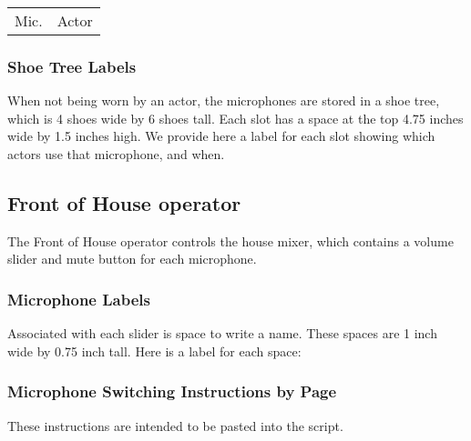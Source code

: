 \documentclass[letterpaper]{article}
\begin{document}
\begin{center}
\begin{longtable}{|l|l|}
\hline Mic. & Actor \endhead \hline

\end{longtable}
\end{center}

\subsubsection {Shoe Tree Labels}

When not being worn by an actor, the microphones are stored in a shoe tree,
which is 4 shoes wide by 6 shoes tall.  
Each slot has a space at the top 4.75 inches wide
by 1.5 inches high.  We provide here a label for each slot showing which
actors use that microphone, and when.

{\Large

}

\subsection {Front of House operator}

The Front of House operator controls the house mixer, 
which contains a volume slider
and mute button for each microphone.  

\subsubsection {Microphone Labels}

Associated with each slider is space to write a name.  
These spaces are 1 inch wide by 0.75 inch tall.  
Here is a label for each space:

{\Large

}

\subsubsection {Microphone Switching Instructions by Page}

These instructions are intended to be pasted into the script.


\end{document}
